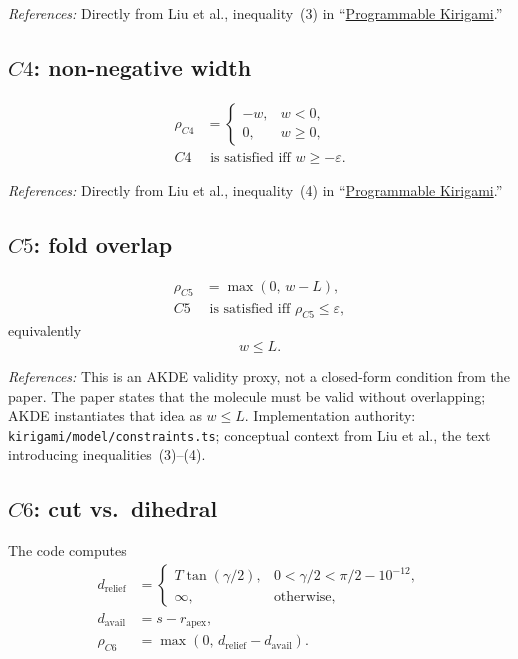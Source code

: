 \documentclass[11pt]{article}
\newcommand{\formularefs}[1]{%
\par\smallskip
\noindent\footnotesize\textit{References: }#1
\par\smallskip\normalsize
}
\begin{document}
\formularefs{Directly from Liu et al., inequality~(3) in ``\href{https://static1.squarespace.com/static/5783b6f903596e5098f3fce8/t/5dd2e95aee053940522eab1a/1574103423054/DETC2019-97557.pdf}{Programmable Kirigami}.''}

\subsection{$C4$: non-negative width}

\begin{align}
\rho_{C4} &=
\begin{cases}
-w, & w<0,\\
0, & w\ge 0,
\end{cases} \\
C4 &\text{ is satisfied iff } w \ge -\varepsilon.
\end{align}

\formularefs{Directly from Liu et al., inequality~(4) in ``\href{https://static1.squarespace.com/static/5783b6f903596e5098f3fce8/t/5dd2e95aee053940522eab1a/1574103423054/DETC2019-97557.pdf}{Programmable Kirigami}.''}

\subsection{$C5$: fold overlap}

\begin{align}
\rho_{C5} &= \max(0,\,w-L), \\
C5 &\text{ is satisfied iff } \rho_{C5} \le \varepsilon,
\end{align}
equivalently
\[
w \le L.
\]

\formularefs{This is an AKDE validity proxy, not a closed-form condition from the paper. The paper states that the molecule must be valid without overlapping; AKDE instantiates that idea as \(w \le L\). Implementation authority: \texttt{kirigami/model/constraints.ts}; conceptual context from Liu et al., the text introducing inequalities~(3)--(4).}

\subsection{$C6$: cut vs.\ dihedral}

The code computes
\begin{align}
d_{\mathrm{relief}} &=
\begin{cases}
T\tan(\gamma/2), & 0<\gamma/2<\pi/2-10^{-12},\\[4pt]
\infty, & \text{otherwise,}
\end{cases} \\
d_{\mathrm{avail}} &= s-r_{\mathrm{apex}}, \\
\rho_{C6} &= \max(0,\,d_{\mathrm{relief}} - d_{\mathrm{avail}}).
\end{align}
\end{document}
